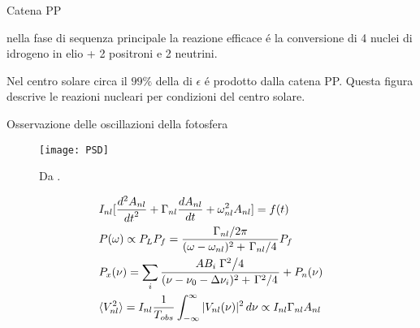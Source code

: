 \documentclass[10pt,xcolor={usenames},fleqn,mathserif,serif]{beamer}
\begin{document}
\begin{wordonframe}{Catena PP}

nella fase di sequenza principale la reazione efficace \'e la conversione di 4 nuclei di idrogeno in elio + 2 positroni e 2 neutrini.

Nel centro solare circa il $99\%$ della di $\epsilon$ \'e prodotto dalla catena PP.
Questa figura descrive le reazioni nucleari per condizioni del centro solare. 

\end{wordonframe}

\begin{frame}{Osservazione delle oscillazioni della fotosfera}

\begin{figure}[!ht]


\texttt{[image: PSD]}
\caption{Da \cite{houdek2006stochastic}.}\label{fig:PSD}

\end{figure}

\begin{align*}
&I_{nl}[\TtwoDy{t}{A_{nl}}+\Gamma_{nl}\TDy{t}{A_{nl}}+\omega_{nl}^2A_{nl}]=f(t)\\
&P(\omega)\propto P_LP_f=\frac{\midfrac{\Gamma_{nl}}{2\pi}}{(\omega-\omega_{nl})^2+\midfrac{\Gamma_{nl}}{4}}P_f\\
&P_x(\nu)=\sum_i\frac{AB_i\midfrac{\Gamma^2}{4}}{(\nu-\nu_0-\Delta\nu_i)^2+\midfrac{\Gamma^2}{4}}+P_n(\nu)\\
&\exv{V_{nl}^2}=I_{nl}\frac{1}{T_{obs}}\int_{-\infty}^{\infty}|V_{nl}(\nu)|^2\,d\nu\propto I_{nl}\Gamma_{nl}A_{nl}
\end{align*}


\end{frame}
\end{document}

